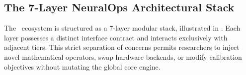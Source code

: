 \subsection{The 7-Layer NeuralOps Architectural Stack}
\label{subsec:7layer_hierarchy}
\label{subsec:registry_architecture}

The \neuralops\ ecosystem is structured as a 7-layer modular stack, illustrated in . Each layer possesses a distinct interface contract and interacts exclusively with adjacent tiers. This strict separation of concerns permits researchers to inject novel mathematical operators, swap hardware backends, or modify calibration objectives without mutating the global core engine.

